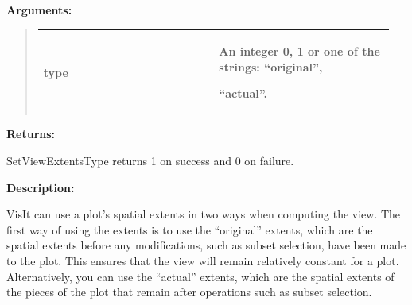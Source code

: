 \documentclass[letterpaper,10pt,english]{sphinxmanual}
\begin{document}
\begin{DUlineblock}{0em}
\item[] 
\item[] \textbf{Arguments:}
\end{DUlineblock}
\begin{quote}

\begin{tabular}{|p{0.475\linewidth}|p{0.475\linewidth}|}
\hline

type
 & 
\begin{DUlineblock}{0em}
\item[] An integer 0, 1 or one of the strings: ``original'',
\item[] ``actual''.
\end{DUlineblock}
\\
\hline\end{tabular}

\end{quote}

\begin{DUlineblock}{0em}
\item[] 
\item[] \textbf{Returns:}
\item[] SetViewExtentsType returns 1 on success and 0 on failure.
\item[] 
\item[] \textbf{Description:}
\item[] VisIt can use a plot's spatial extents in two ways when computing the
view. The first way of using the extents is to use the ``original''
extents, which are the spatial extents before any modifications, such as
subset selection, have been made to the plot. This ensures that the view
will remain relatively constant for a plot. Alternatively, you can use the
``actual'' extents, which are the spatial extents of the pieces of the plot
that remain after operations such as subset selection.
\end{DUlineblock}

\begin{DUlineblock}{0em}
\item[] 
\end{DUlineblock}
\end{document}
